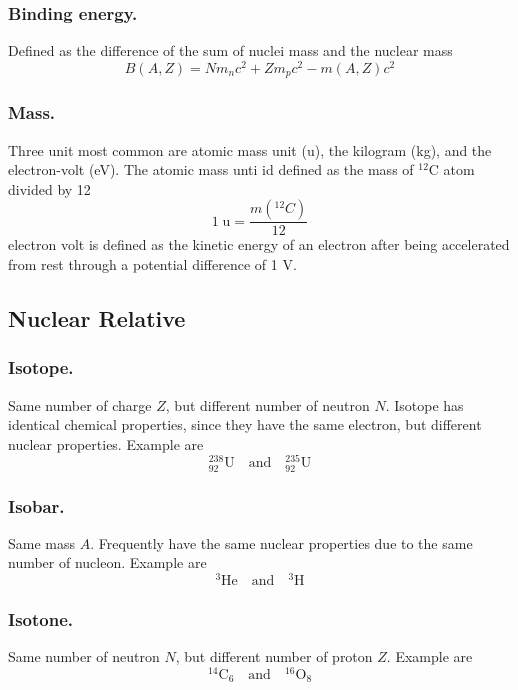 \documentclass[../../../main.tex]{subfiles}
\begin{document}
\subsubsection*{Binding energy.} Defined as the difference of the sum of nuclei mass and the nuclear mass 
\begin{equation*}
    B(A,Z)=Nm_nc^2+Zm_pc^2-m(A,Z)c^2
\end{equation*} 

\subsubsection*{Mass.} Three unit most common are atomic mass unit (u), the kilogram (kg), and the electron-volt (eV). The atomic mass unti id defined as the mass of $^{12}$C atom divided by 12
\begin{equation*}
    1\;\text{u}=\frac{m (^{12}C)}{12}
\end{equation*}
electron volt is defined as the kinetic energy of an electron after being accelerated from rest through a potential diﬀerence of 1 V.

\subsection*{Nuclear Relative}
\subsubsection*{Isotope.} Same number of charge $Z$, but different number of neutron $N$. Isotope has identical chemical properties, since they have the same electron, but different nuclear properties. Example are
\begin{equation*}
    ^{238}_{92}\text{U}\quad\text{and}\quad    ^{235}_{92}\text{U}
\end{equation*}

\subsubsection*{Isobar.} Same mass $A$. Frequently have the same nuclear properties due to the same number of nucleon. Example are
\begin{equation*}
    ^{3}\text{He}\quad\text{and}\quad    ^{3}\text{H}
\end{equation*}

\subsubsection*{Isotone.} Same number of neutron $N$, but different number of proton $Z$. Example are
\begin{equation*}
    ^{14}\text{C}_6\quad\text{and}\quad    ^{16}\text{O}_8
\end{equation*}
\end{document}
